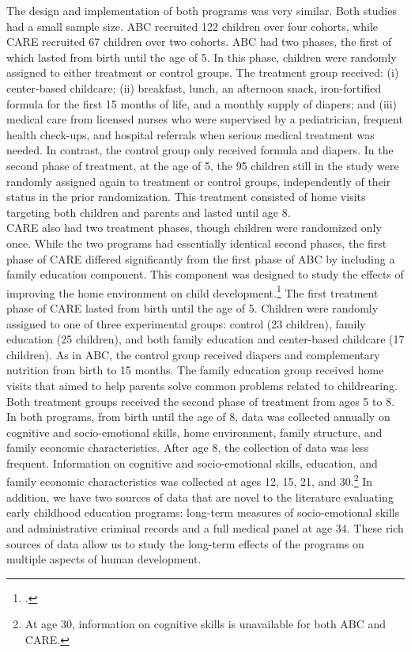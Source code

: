 \noindent The design and implementation of both programs was very similar. Both studies had a small sample size. ABC recruited 122 children over four cohorts, while CARE recruited 67 children over two cohorts. ABC had two phases, the first of which lasted from birth until the age of 5. In this phase, children were randomly assigned to either treatment or control groups. The treatment group received: (i) center-based childcare; (ii) breakfast, lunch, an afternoon snack, iron-fortified formula for the first 15 months of life, and a monthly supply of diapers; and (iii) medical care from licensed nurses who were supervised by a pediatrician, frequent health check-ups, and hospital referrals when serious medical treatment was needed. In contrast, the control group only received formula and diapers. In the second phase of treatment, at the age of 5, the 95 children still in the study were randomly assigned again to treatment or control groups, independently of their status in the prior randomization. This treatment consisted of home visits targeting both children and parents and lasted until age 8.\\ 

\noindent  CARE also had two treatment phases, though children were randomized only once. While the two programs had essentially identical second phases, the first phase of CARE differed significantly from the first phase of ABC by including a family education component. This component was designed to study the effects of improving the home environment on child development.\footnote{\citet{Wasik_Ramey_etal_1990_CD}.} The first treatment phase of CARE lasted from birth until the age of 5. Children were randomly assigned to one of three experimental groups: control (23 children), family education (25 children), and both family education and center-based childcare (17 children). As in ABC, the control group received diapers and complementary nutrition from birth to 15 months. The family education group received home visits that aimed to help parents solve common problems related to childrearing. Both treatment groups received the second phase of treatment from ages 5 to 8.\\

\noindent In both programs, from birth until the age of 8, data was collected annually on cognitive and socio-emotional skills, home environment, family structure, and family economic characteristics. After age 8, the collection of data was less frequent. Information on cognitive and socio-emotional skills, education, and family economic characteristics was collected at ages 12, 15, 21, and 30.\footnote{At age 30, information on cognitive skills is unavailable for both ABC and CARE.} In addition, we have two sources of data that are novel to the literature evaluating early childhood education programs: long-term measures of socio-emotional skills and administrative criminal records and a full medical panel at age 34. These rich sources of data allow us to study the long-term effects of the programs on multiple aspects of human development.

